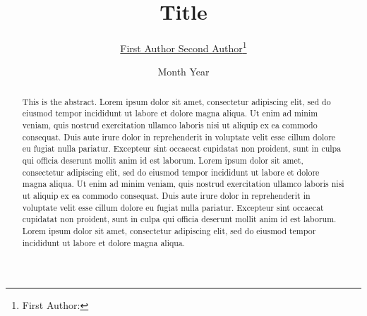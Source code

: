 \documentclass[12pt,twoside]{article}
\begin{document}



\begin{spacing}{0.9}
\begin{titlepage}

\title{Title}

\author{\large \href{https://sites.google.com/view/jaeyungkim}{First Author Second Author}\thanks{First Author: }}

\date{\large Month Year}
\maketitle
\thispagestyle{empty}

\vspace{-0.3in}

\begin{abstract}
This is the abstract. Lorem ipsum dolor sit amet, consectetur adipiscing elit, sed do
eiusmod tempor incididunt ut labore et dolore magna aliqua. Ut enim ad minim veniam,
quis nostrud exercitation ullamco laboris nisi ut aliquip ex ea commodo consequat. Duis
aute irure dolor in reprehenderit in voluptate velit esse cillum dolore eu fugiat nulla
pariatur. Excepteur sint occaecat cupidatat non proident, sunt in culpa qui officia deserunt
mollit anim id est laborum. Lorem ipsum dolor sit amet, consectetur adipiscing elit, sed do
eiusmod tempor incididunt ut labore et dolore magna aliqua. Ut enim ad minim veniam,
quis nostrud exercitation ullamco laboris nisi ut aliquip ex ea commodo consequat. Duis
aute irure dolor in reprehenderit in voluptate velit esse cillum dolore eu fugiat nulla
pariatur. Excepteur sint occaecat cupidatat non proident, sunt in culpa qui officia deserunt
mollit anim id est laborum. Lorem ipsum dolor sit amet, consectetur adipiscing elit, sed
do eiusmod tempor incididunt ut labore et dolore magna aliqua.
\end{abstract}

\end{titlepage}
\end{spacing}


\end{document}
